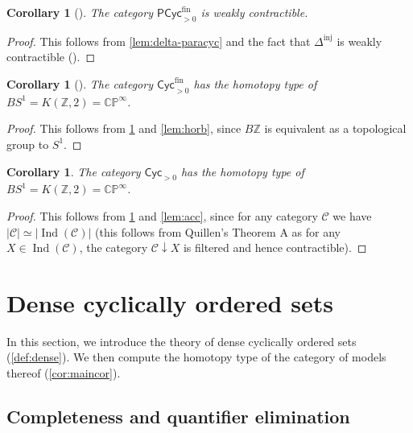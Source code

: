 \documentclass{amsart}
\theoremstyle{plain}
\newtheorem{cor}[thm]{Corollary}
\theoremstyle{definition}
\newcommand{\ints}{\mathbb{Z}}
\newcommand{\cpx}{\mathbb{C}}
\DeclareMathOperator{\Ind}{Ind}
\newcommand{\calC}{\mathcal{C}}
\newcommand{\Cyc}{\mathsf{Cyc}}
\newcommand{\fin}{\mathrm{fin}}
\newcommand{\catdeloop}{B}
\newcommand{\Paracyc}{\mathsf{PCyc}}
\newcommand{\inj}{\mathrm{inj}}
\newcommand{\pjv}{\mathbb{P}}
\begin{document}
\begin{cor}[\cite{cisinski,nikolaus-scholze}]\label{cor:paracyc-contr}
The category $\Paracyc^\fin_{>0}$ is weakly contractible.
\end{cor}
\begin{proof}
This follows from \cref{lem:delta-paracyc} and the fact that $\Delta^\inj$ is weakly contractible (\cite[1.7.24]{maltsiniotis}).
\end{proof}

\begin{cor}[\cite{cisinski,nikolaus-scholze,connes}]\label{cor:cyc-bs1}
The category $\Cyc^\fin_{>0}$ has the homotopy type of $BS^1 = K(\ints,2) = \cpx\pjv^\infty$.
\end{cor}
\begin{proof}
This follows from \cref{cor:paracyc-contr} and \cref{lem:horb}, since $\catdeloop\ints$ is equivalent as a topological group to $S^1$.
\end{proof}

\begin{cor}\label{cor:cyc-bs1-bis}
    The category $\Cyc_{>0}$ has the homotopy type of $BS^1 = K(\ints,2) = \cpx \pjv^\infty$.
\end{cor}
\begin{proof}
    This follows from \cref{cor:cyc-bs1} and \cref{lem:acc}, since for any category $\calC$ we have $|\calC| \simeq |\Ind(\calC)|$ (this follows from Quillen's Theorem A as for any $X \in \Ind(\calC)$, the category $\calC \downarrow X$ is filtered and hence contractible).
\end{proof}

\section{Dense cyclically ordered sets}\label{sec:dense}
In this section, we introduce the theory of dense cyclically ordered sets (\cref{def:dense}). We then compute the homotopy type of the category of models thereof (\cref{cor:maincor}).

\subsection{Completeness and quantifier elimination}
\end{document}
